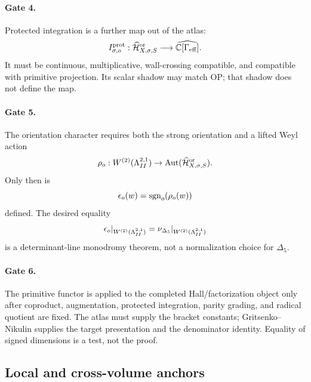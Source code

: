 \paragraph{Gate 4.}
Protected integration is a further map out of the atlas:
\[
   I^{\mathrm{prot}}_{\sigma,o}:
   \widehat{\mathcal H}^{\mathrm{or}}_{X,\sigma,S}
   \longrightarrow
   \widehat{\mathbb C[\Gamma_{\mathrm{eff}}]}.
\]
It must be continuous, multiplicative, wall-crossing compatible, and
compatible with primitive projection.  Its scalar shadow may match OP;
that shadow does not define the map.

\paragraph{Gate 5.}
The orientation character requires both the strong orientation and a
lifted Weyl action
\[
   \rho_o:W^{(2)}(\Lambda^{2,1}_{II})
   \to
   \operatorname{Aut}
   (\widehat{\mathcal H}^{\mathrm{or}}_{X,\sigma,S}).
\]
Only then is
\[
   \epsilon_o(w)=\operatorname{sgn}_o(\rho_o(w))
\]
defined.  The desired equality
\[
   \epsilon_o|_{W^{(2)}(\Lambda^{2,1}_{II})}
   =
   \nu_{\Delta_5}|_{W^{(2)}(\Lambda^{2,1}_{II})}
\]
is a determinant-line monodromy theorem, not a normalization choice for
\(\Delta_5\).

\paragraph{Gate 6.}
The primitive functor is applied to the completed Hall/factorization
object only after coproduct, augmentation, protected integration, parity
grading, and radical quotient are fixed.  The atlas must supply the
bracket constants; Gritsenko--Nikulin supplies the target presentation
and the denominator identity.  Equality of signed dimensions is a test,
not the proof.

\subsection{Local and cross-volume anchors}

